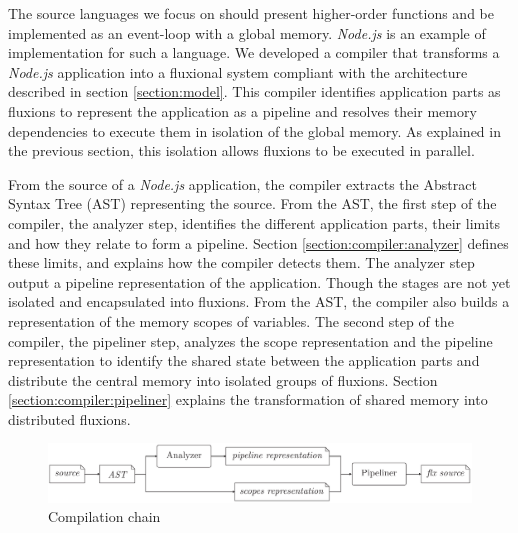 The source languages we focus on should present higher-order functions and be implemented as an event-loop with a global memory.
\textit{Node.js} is an example of implementation for such a language.
We developed a compiler that transforms a \textit{Node.js} application into a fluxional system compliant with the architecture described in section \ref{section:model}.
This compiler identifies application parts as fluxions to represent the application as a pipeline and resolves their memory dependencies to execute them in isolation of the global memory.
As explained in the previous section, this isolation allows fluxions to be executed in parallel.


From the source of a \textit{Node.js} application, the compiler extracts the Abstract Syntax Tree (AST) representing the source.
From the AST, the first step of the compiler, the analyzer step, identifies the different application parts, their limits and how they relate to form a pipeline.
Section \ref{section:compiler:analyzer} defines these limits, and explains how the compiler detects them.
The analyzer step output a pipeline representation of the application.
Though the stages are not yet isolated and encapsulated into fluxions.
From the AST, the compiler also builds a representation of the memory scopes of variables.
The second step of the compiler, the pipeliner step, analyzes the scope representation and the pipeline representation to identify the shared state between the application parts and distribute the central memory into isolated groups of fluxions.
Section \ref{section:compiler:pipeliner} explains the transformation of shared memory into distributed fluxions.

\begin{figure}[h!]
\begin{center}
  \includegraphics[width=\linewidth]{ressources/compiler-stream.pdf}
  \caption{Compilation chain}
  \label{fig:compilation}
\end{center}
\end{figure}


